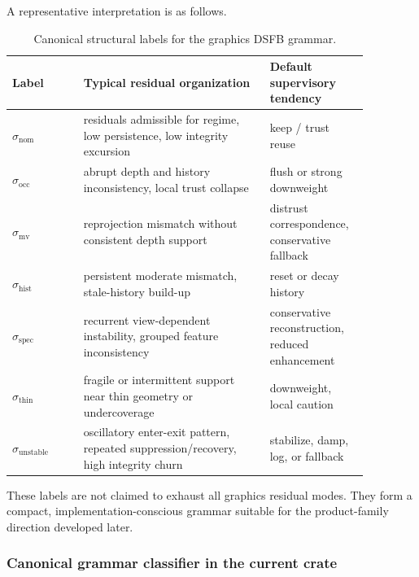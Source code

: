 \documentclass[11pt]{article}
\theoremstyle{definition}
\theoremstyle{plain}
\begin{document}
A representative interpretation is as follows.

\begin{table}[H]
\centering
\caption{Canonical structural labels for the graphics DSFB grammar.}
\begin{tabular}{>{\raggedright\arraybackslash}p{0.18\linewidth} >{\raggedright\arraybackslash}p{0.47\linewidth} >{\raggedright\arraybackslash}p{0.22\linewidth}}
\toprule
Label & Typical residual organization & Default supervisory tendency \\
\midrule
$\sigma_{\mathrm{nom}}$ & residuals admissible for regime, low persistence, low integrity excursion & keep / trust reuse \\
$\sigma_{\mathrm{occ}}$ & abrupt depth and history inconsistency, local trust collapse & flush or strong downweight \\
$\sigma_{\mathrm{mv}}$ & reprojection mismatch without consistent depth support & distrust correspondence, conservative fallback \\
$\sigma_{\mathrm{hist}}$ & persistent moderate mismatch, stale-history build-up & reset or decay history \\
$\sigma_{\mathrm{spec}}$ & recurrent view-dependent instability, grouped feature inconsistency & conservative reconstruction, reduced enhancement \\
$\sigma_{\mathrm{thin}}$ & fragile or intermittent support near thin geometry or undercoverage & downweight, local caution \\
$\sigma_{\mathrm{unstable}}$ & oscillatory enter-exit pattern, repeated suppression/recovery, high integrity churn & stabilize, damp, log, or fallback \\
\bottomrule
\end{tabular}
\end{table}

These labels are not claimed to exhaust all graphics residual modes. They form a compact, implementation-conscious grammar suitable for the product-family direction developed later.

\subsubsection{Canonical grammar classifier in the current crate}
\label{sec:grammar-classifier}
\end{document}
